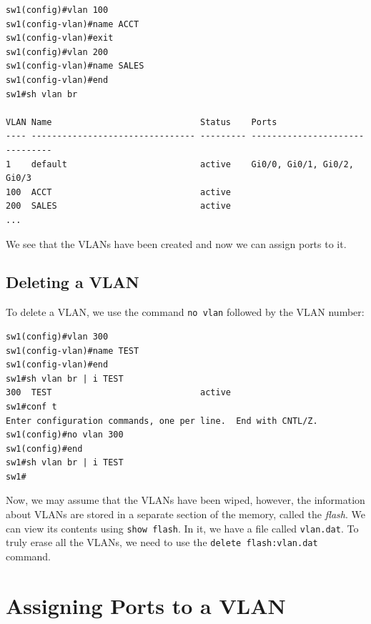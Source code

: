 \vspace{-15pt}
\begin{verbatim}
sw1(config)#vlan 100
sw1(config-vlan)#name ACCT
sw1(config-vlan)#exit
sw1(config)#vlan 200
sw1(config-vlan)#name SALES
sw1(config-vlan)#end
sw1#sh vlan br

VLAN Name                             Status    Ports
---- -------------------------------- --------- -------------------------------
1    default                          active    Gi0/0, Gi0/1, Gi0/2, Gi0/3
100  ACCT                             active
200  SALES                            active
...
\end{verbatim}
\vspace{-10pt}

\noindent
We see that the VLANs have been created and now we can assign ports to it.

\subsection{Deleting a VLAN}
To delete a VLAN, we use the command \verb|no vlan| followed by the VLAN number:

\vspace{-15pt}
\begin{verbatim}
sw1(config)#vlan 300
sw1(config-vlan)#name TEST
sw1(config-vlan)#end
sw1#sh vlan br | i TEST
300  TEST                             active
sw1#conf t
Enter configuration commands, one per line.  End with CNTL/Z.
sw1(config)#no vlan 300
sw1(config)#end
sw1#sh vlan br | i TEST
sw1#
\end{verbatim}
\vspace{-10pt}

\noindent
Now, we may assume that the VLANs have been wiped, however, the information about VLANs are stored in a separate section of the memory, called the \textit{flash}. We can view its contents using \verb|show flash|. In it, we have a file called \verb|vlan.dat|. To truly erase all the VLANs, we need to use the \verb|delete flash:vlan.dat| command. 

\section{Assigning Ports to a VLAN}

